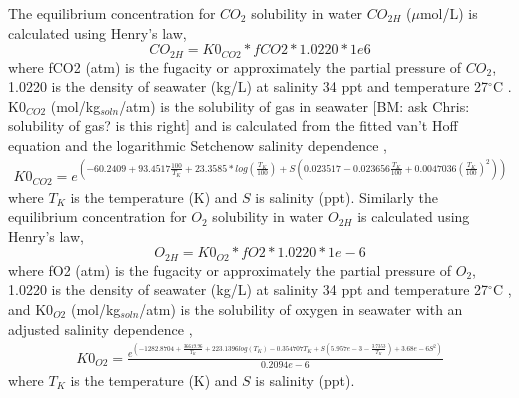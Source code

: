 \documentclass{ruthesis}
\begin{document}
The equilibrium concentration for $CO_2$ solubility in water $CO_{2H}$ ($\mu$mol/L) is calculated using Henry's law,
\begin{equation}\label{eq:CO2H_eq}
CO_{2H}=K0_{CO2}*fCO2*1.0220*1e6
\end{equation}
where fCO2 (atm) is the fugacity or approximately the partial pressure of $CO_2$, 1.0220 is the density of seawater (kg/L) at salinity 34 ppt and temperature 27$^{\circ}$C \cite{ramsing2011seawater} \cite{greensberg1992standard}. K0$_{CO2}$ (mol/kg$_{soln}$/atm) is the solubility of gas in seawater [BM: ask Chris: solubility of gas? is this right] and is calculated from the fitted van't Hoff equation and the logarithmic Setchenow salinity dependence \cite{weiss1974carbon},
\begin{equation}
\begin{aligned}
K0_{CO2} = e^{(- 60.2409 + 93.4517\frac{100}{T_K}  + 23.3585*log(\frac{T_K}{100})+ 
S(0.023517 - 0.023656\frac{T_K}{100} + 0.0047036(\frac{T_K}{100})^2))}
\end{aligned}
\end{equation}
where $T_K$ is the temperature (K) and $S$ is salinity (ppt).
Similarly the equilibrium concentration for $O_2$ solubility in water $O_{2H}$ is calculated using Henry's law,
\begin{equation}\label{eq:O2H_eq}
O_{2H}=K0_{O2}*fO2*1.0220*1e-6
\end{equation}
where fO2 (atm) is the fugacity or approximately the partial pressure of $O_2$, 1.0220 is the density of seawater (kg/L) at salinity 34 ppt and temperature 27$^{\circ}$C \cite{ramsing2011seawater} \cite{greensberg1992standard}, and K0$_{O2}$ (mol/kg$_{soln}$/atm) is the solubility of oxygen in seawater with an adjusted salinity dependence \cite{battino1983solubility},
\begin{equation}
\begin{aligned}
K0_{O2} =  \frac{e^{(-1282.8704 + \frac{36619.96}{T_K} + 223.1396 log(T_K) -0.354707 T_K 
+ S(5.957e-3 -\frac{3.7353}{T_K}) + 3.68e-6 S^2)}}{0.2094e-6}
\end{aligned}
\end{equation}
where $T_K$ is the temperature (K) and $S$ is salinity (ppt).
\end{document}
